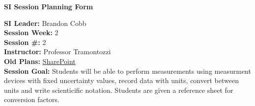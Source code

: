 \documentclass{article}
\begin{document}
\begin{center}
    {\LARGE \textbf{SI Session Planning Form}}
\end{center}

\vspace{0.5cm}

\noindent
\begin{flushleft}
\textbf{SI Leader:} Brandon Cobb \\
\textbf{Session Week:} 2 \\
\textbf{Session \#:} 2 \\
\textbf{Instructor:} Professor Tramontozzi \\
\textbf{Old Plans:} \href{https://macombedu.sharepoint.com/:b:/s/ASC-SupplementalInstructionEmbeddedTutoring/EeSYqCwT_KhMolgJvXbVEjgBOyF_DevvS8BgCm1zPkQQJg?e=QJTt4o}{SharePoint} \\
\textbf{Session Goal:} Students will be able to perform measurements using measurment devices with fixed uncertainty values, record data with units, convert between units and write scienticific notation. Students are given a reference sheet for conversion factors.
\end{flushleft}

\vspace{1em}
\end{document}
